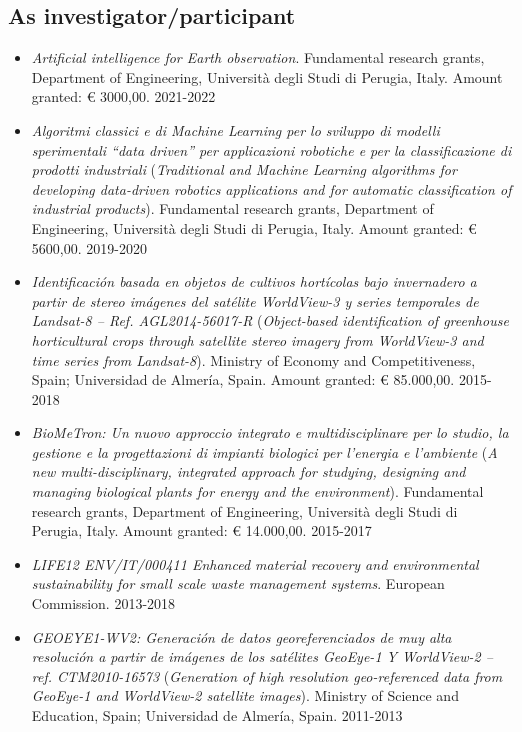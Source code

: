 \documentclass[11pt]{article}
\begin{document}
\subsection*{As investigator/participant}

\begin{itemize}
	\item \emph{Artificial intelligence for Earth observation}. Fundamental research grants, Department of Engineering, Università degli Studi di Perugia, Italy. Amount granted: € 3000,00. \hfill 2021-2022
	
	\item \emph{Algoritmi  classici e  di Machine  Learning per lo sviluppo di modelli sperimentali ``data driven'' per applicazioni robotiche e per la classificazione di prodotti industriali} (\emph{Traditional and Machine Learning algorithms for developing data-driven robotics applications and for automatic classification of industrial products}). Fundamental research grants, Department of Engineering, Università degli Studi di Perugia, Italy. Amount granted: € 5600,00. \hfill 2019-2020
	
	\item \emph{Identificación basada en objetos de cultivos hortícolas bajo invernadero a partir de stereo imágenes del satélite WorldView-3 y series temporales de Landsat-8 -- Ref. AGL2014-56017-R} (\emph{Object-based identification of greenhouse horticultural crops through satellite stereo imagery from WorldView-3 and time series from Landsat-8}). Ministry of Economy and Competitiveness, Spain; Universidad de Almería, Spain. Amount granted: € 85.000,00. \hfill 2015-2018
	
	\item \emph{BioMeTron: Un nuovo approccio integrato e multidisciplinare per lo studio, la gestione e la progettazioni di impianti biologici per l'energia e l'ambiente} (\emph{A new multi-disciplinary, integrated approach for studying, designing and managing biological plants for energy and the environment}). Fundamental research grants, Department of Engineering, Università degli Studi di Perugia, Italy. Amount granted: € 14.000,00. \hfill 2015-2017

	\item \emph{LIFE12 ENV/IT/000411 Enhanced material recovery and environmental sustainability for small scale waste management systems}. European Commission. \hfill 2013-2018
	
	\item \emph{GEOEYE1-WV2: Generación de datos georeferenciados de muy alta resolución a partir de imágenes de los satélites GeoEye-1 Y WorldView-2 -- ref. CTM2010-16573} (\emph{Generation of high resolution geo-referenced data from GeoEye-1 and WorldView-2 satellite images}). Ministry of Science and Education, Spain; Universidad de Almería, Spain. \hfill 2011-2013
	

\end{itemize}
\end{document}
